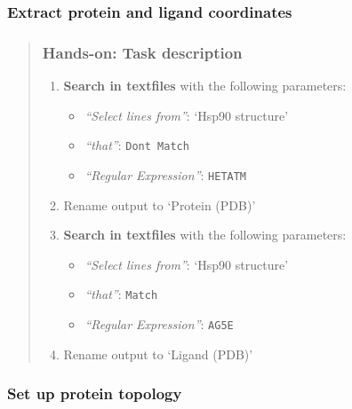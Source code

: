 \documentclass[twocolumn]{bmcart}%
\providecommand{\tightlist}{%
  \setlength{\itemsep}{0pt}\setlength{\parskip}{0pt}}
\providecommand{\tightlist}{%
  \setlength{\itemsep}{0pt}\setlength{\parskip}{0pt}}
\begin{document}
\subsubsection{Extract protein and ligand
coordinates}\label{extract-protein-and-ligand-coordinates}



\begin{quote}
\subsubsection{Hands-on: Task
description}\label{hands-on-task-description}

\begin{enumerate}
\def\labelenumi{\arabic{enumi}.}
\tightlist
\item
  \textbf{Search in textfiles} with the following parameters:
  \begin{itemize}
  \tightlist
  \item
    \emph{``Select lines from''}: `Hsp90 structure'\\
  \item
    \emph{``that''}: \texttt{Don\textquotesingle{}t\ Match}
  \item
    \emph{``Regular Expression''}: \texttt{HETATM}
  \end{itemize}
\item
  Rename output to `Protein (PDB)'
\item
  \textbf{Search in textfiles} with the following parameters:

  \begin{itemize}
  \tightlist
  \item
    \emph{``Select lines from''}: `Hsp90 structure'\\
  \item
    \emph{``that''}: \texttt{Match}
  \item
    \emph{``Regular Expression''}: \texttt{AG5E}
  \end{itemize}
\item
  Rename output to `Ligand (PDB)'
\end{enumerate}


\end{quote}

\hypertarget{set-up-protein-topology}{%
\subsubsection{Set up protein topology}\label{set-up-protein-topology}}
\end{document}
